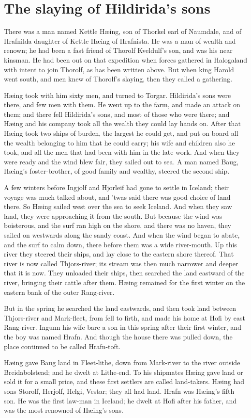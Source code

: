 \chapter{The slaying of Hildirida's sons}
There was a man named Kettle H\ae ing, son of Thorkel earl of Naumdale, and of Hrafnilda daughter of Kettle H\ae ing of Hrafnista. He was a man of wealth and renown; he had been a fast friend of Thorolf Kveldulf's son, and was his near kinsman. He had been out on that expedition when forces gathered in Halogaland with intent to join Thorolf, as has been written above. But when king Harold went south, and men knew of Thorolf's slaying, then they called a gathering.

H\ae ing took with him sixty men, and turned to Torgar. Hildirida's sons were there, and few men with them. He went up to the farm, and made an attack on them; and there fell Hildirida's sons, and most of those who were there; and H\ae ing and his company took all the wealth they could lay hands on. After that H\ae ing took two ships of burden, the largest he could get, and put on board all the wealth belonging to him that he could carry; his wife and children also he took, and all the men that had been with him in the late work. And when they were ready and the wind blew fair, they sailed out to sea. A man named Baug, H\ae ing's foster-brother, of good family and wealthy, steered the second ship.

A few winters before Ingjolf and Hjorleif had gone to settle in Iceland; their voyage was much talked about, and 'twas said there was good choice of land there. So H\ae ing sailed west over the sea to seek Iceland. And when they saw land, they were approaching it from the south. But because the wind was boisterous, and the surf ran high on the shore, and there was no haven, they sailed on westwards along the sandy coast. And when the wind began to abate, and the surf to calm down, there before them was a wide river-mouth. Up this river they steered their ships, and lay close to the eastern shore thereof. That river is now called Thjors-river; its stream was then much narrower and deeper that it is now. They unloaded their ships, then searched the land eastward of the river, bringing their cattle after them. H\ae ing remained for the first winter on the eastern bank of the outer Rang-river.

But in the spring he searched the land eastwards, and then took land between Thjors-river and Mark-fleet, from fell to firth, and made his home at Hofi by east Rang-river. Ingunn his wife bare a son in this spring after their first winter, and the boy was named Hrafn. And though the house there was pulled down, the place continued to be called Hrafn-toft.

H\ae ing gave Baug land in Fleet-lithe, down from Mark-river to the river outside Breidabolstead; and he dwelt at Lithe-end. To his shipmates H\ae ing gave land or sold it for a small price, and these first settlers are called land-takers. H\ae ing had sons Storolf, Herjolf, Helgi, Vestar; they all had land. Hrafn was H\ae ing's fifth son. He was the first law-man in Iceland; he dwelt at Hofi after his father, and was the most renowned of H\ae ing's sons.

